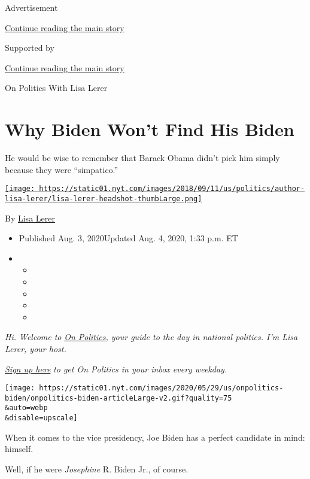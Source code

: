 Advertisement

\protect\hyperlink{after-top}{Continue reading the main story}

Supported by

\protect\hyperlink{after-sponsor}{Continue reading the main story}

On Politics With Lisa Lerer

\hypertarget{why-biden-wont-find-his-biden}{%
\section{Why Biden Won't Find His
Biden}\label{why-biden-wont-find-his-biden}}

He would be wise to remember that Barack Obama didn't pick him simply
because they were ``simpatico.''

\href{https://www.nytimes.com/by/lisa-lerer}{\texttt{[image: https://static01.nyt.com/images/2018/09/11/us/politics/author-lisa-lerer/lisa-lerer-headshot-thumbLarge.png]}}

By \href{https://www.nytimes.com/by/lisa-lerer}{Lisa Lerer}

\begin{itemize}
\item
  Published Aug. 3, 2020Updated Aug. 4, 2020, 1:33 p.m. ET
\item
  \begin{itemize}
  \item
  \item
  \item
  \item
  \item
  \end{itemize}
\end{itemize}

\emph{Hi. Welcome to}
\href{https://www.nytimes.com/spotlight/on-politics}{\emph{On
Politics}}\emph{, your guide to the day in national politics. I'm Lisa
Lerer, your host.}

\href{https://www.nytimes.com/newsletters/politics?module=inline}{\emph{Sign
up here}} \emph{to get On Politics in your inbox every weekday.}

\texttt{[image: https://static01.nyt.com/images/2020/05/29/us/onpolitics-biden/onpolitics-biden-articleLarge-v2.gif?quality=75\\\&auto=webp\\\&disable=upscale]}

When it comes to the vice presidency, Joe Biden has a perfect candidate
in mind: himself.

Well, if he were \emph{Josephine} R. Biden Jr., of course.

